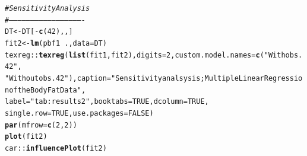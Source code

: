 \documentclass[11pt,letter]{article}\usepackage[]{graphicx}\usepackage[]{color}
\makeatletter
\newcommand{\hlnum}[1]{\textcolor[rgb]{0.686,0.059,0.569}{#1}}%
\newcommand{\hlstr}[1]{\textcolor[rgb]{0.192,0.494,0.8}{#1}}%
\newcommand{\hlcom}[1]{\textcolor[rgb]{0.678,0.584,0.686}{\textit{#1}}}%
\newcommand{\hlopt}[1]{\textcolor[rgb]{0,0,0}{#1}}%
\newcommand{\hlstd}[1]{\textcolor[rgb]{0.345,0.345,0.345}{#1}}%
\newcommand{\hlkwb}[1]{\textcolor[rgb]{0.69,0.353,0.396}{#1}}%
\newcommand{\hlkwc}[1]{\textcolor[rgb]{0.333,0.667,0.333}{#1}}%
\newcommand{\hlkwd}[1]{\textcolor[rgb]{0.737,0.353,0.396}{\textbf{#1}}}%
\newenvironment{kframe}{%
 \def\at@end@of@kframe{}%
 \ifinner\ifhmode%
  \def\at@end@of@kframe{\end{minipage}}%
  \begin{minipage}{\columnwidth}%
 \fi\fi%
 \def\FrameCommand##1{\hskip\@totalleftmargin \hskip-\fboxsep
 \colorbox{shadecolor}{##1}\hskip-\fboxsep
     \hskip-\linewidth \hskip-\@totalleftmargin \hskip\columnwidth}%
 \MakeFramed {\advance\hsize-\width
   \@totalleftmargin\z@ \linewidth\hsize
   \@setminipage}}%
 {\par\unskip\endMakeFramed%
 \at@end@of@kframe}
\newenvironment{knitrout}{}{} %
\makeatother
\begin{document}
\begin{knitrout}
\begin{kframe}
\begin{alltt}
\hlcom{# Sensitivity Analysis}
\hlcom{# ----------------------------------------------------}
\hlstd{DT} \hlkwb{<-} \hlstd{DT[}\hlopt{-}\hlkwd{c}\hlstd{(}\hlnum{42}\hlstd{), , ]}
\hlstd{fit2} \hlkwb{<-} \hlkwd{lm}\hlstd{(pbf1} \hlopt{~} \hlstd{.,} \hlkwc{data} \hlstd{= DT)}
\hlstd{texreg}\hlopt{::}\hlkwd{texreg}\hlstd{(}\hlkwd{list}\hlstd{(fit1, fit2),} \hlkwc{digits} \hlstd{=} \hlnum{2}\hlstd{,} \hlkwc{custom.model.names} \hlstd{=} \hlkwd{c}\hlstd{(}\hlstr{"With obs. 42"}\hlstd{,}
    \hlstr{"Without obs. 42"}\hlstd{),} \hlkwc{caption} \hlstd{=} \hlstr{"Sensitivity analsysis; Multiple Linear Regression of the Body Fat Data"}\hlstd{,}
    \hlkwc{label} \hlstd{=} \hlstr{"tab:results2"}\hlstd{,} \hlkwc{booktabs} \hlstd{=} \hlnum{TRUE}\hlstd{,} \hlkwc{dcolumn} \hlstd{=} \hlnum{TRUE}\hlstd{,}
    \hlkwc{single.row} \hlstd{=} \hlnum{TRUE}\hlstd{,} \hlkwc{use.packages} \hlstd{=} \hlnum{FALSE}\hlstd{)}
\hlkwd{par}\hlstd{(}\hlkwc{mfrow} \hlstd{=} \hlkwd{c}\hlstd{(}\hlnum{2}\hlstd{,} \hlnum{2}\hlstd{))}
\hlkwd{plot}\hlstd{(fit2)}
\hlstd{car}\hlopt{::}\hlkwd{influencePlot}\hlstd{(fit2)}
\end{alltt}
\end{kframe}
\end{knitrout}

\newpage
\end{document}
